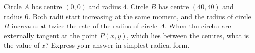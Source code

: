 Circle $A$ has centre $(0,0)$ and radius $4$. Circle $B$ has centre $(40,40)$ and radius $6$. Both radii start increasing at the same moment, and the radius of circle $B$ increases at twice the rate of the radius of circle $A$. When the circles are externally tangent at the point $P(x,y)$, which lies between the centres, what is the value of $x$? Express your answer in simplest radical form.
